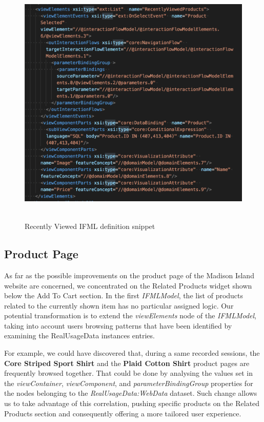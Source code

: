 \vspace{0.5cm}
\begin{figure}[H]
  \centering
    \includegraphics[height=12cm]{images/madison/ifml-recently-viewed.png}
  \caption{Recently Viewed IFML definition snippet}
  \label{fig:recently-viewed-ifml-definition}
\end{figure}
\vspace{0.5cm}

\subsection{Product Page}
\label{product-page-updates}

As far as the possible improvements on the product page of the Madison Island website are concerned, we concentrated on the Related Products widget shown below the Add To Cart section. In the first \textit{IFMLModel}, the list of products related to the currently shown item has no particular assigned logic. Our potential transformation is to extend the \textit{viewElements} node of the \textit{IFMLModel}, taking into account users browsing patterns that have been identified by examining the RealUsageData instances entries.

For example, we could have discovered that, during a same recorded sessions, the \textbf{Core Striped Sport Shirt} and the \textbf{Plaid Cotton Shirt} product pages are frequently browsed together. That could be done by analysing the values set in the \textit{viewContainer}, \textit{viewComponent}, and \textit{parameterBindingGroup} properties for the nodes belonging to the \textit{RealUsageData:WebData} dataset. Such change allows us to take advantage of this correlation, pushing specific products on the Related Products section and consequently offering a more tailored user experience.

